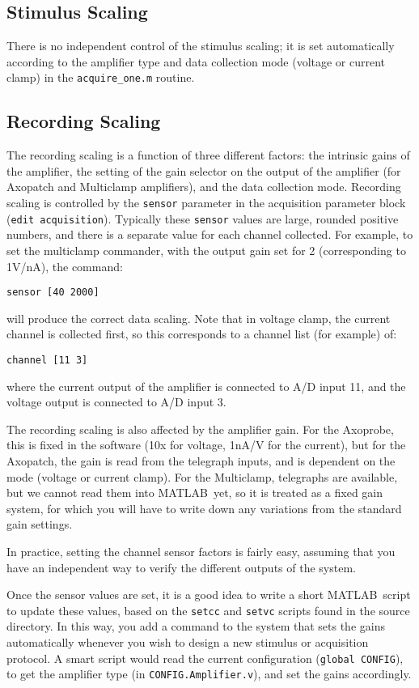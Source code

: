 \documentclass[11pt, letterpaper, titlepage]{paper}
\newcommand{\ml}{\textsf{MATLAB}}
\begin{document}
\subsection{Stimulus Scaling}
There is no independent control of the stimulus scaling; it is set 
automatically according to the amplifier type and data collection 
mode (voltage or current clamp) in the \texttt{acquire\_one.m} 
routine.

\subsection{Recording Scaling}
The recording scaling is a function of three different factors: 
the intrinsic gains of the amplifier, the setting of the gain 
selector on the output of the amplifier (for Axopatch and 
Multiclamp amplifiers), and the data collection mode. Recording 
scaling is controlled by the \texttt{sensor} parameter in the 
acquisition parameter block (\texttt{edit acquisition}). Typically 
these \texttt{sensor} values are large, rounded positive numbers, 
and there is a separate value for each channel collected. For 
example, to set the multiclamp commander, with the output gain set 
for 2 (corresponding to 1V/nA), the command:

\verb"sensor [40 2000]"

will produce the correct data scaling. Note that in voltage clamp, 
the current channel is collected first, so this corresponds to a 
channel list (for example) of:

\verb"channel [11 3]"

where the current output of the amplifier is connected to A/D 
input 11, and the voltage output is connected to A/D input 3.

The recording scaling is also affected by the amplifier gain. For 
the Axoprobe, this is fixed in the software (10x for voltage, 
1nA/V for the current), but for the Axopatch, the gain is read 
from the telegraph inputs, and is dependent on the mode (voltage 
or current clamp). For the Multiclamp, telegraphs are available, 
but we cannot read them into \ml\ yet, so it is treated as a fixed 
gain system, for which you will have to write down any variations 
from the standard gain settings.

In practice, setting the channel sensor factors is fairly easy, 
assuming that you have an independent way to verify the different 
outputs of the system.

Once the sensor values are set, it is a good idea to write a short 
\ml\ script to update these values, based on the \texttt{setcc} 
and \texttt{setvc} scripts found in the source directory. In this 
way, you add a command to the system that sets the gains 
automatically whenever you wish to design a new stimulus or 
acquisition protocol. A smart script would read the current 
configuration (\texttt{global CONFIG}), to get the amplifier type 
(in \texttt{CONFIG.Amplifier.v}), and set the gains accordingly.
\end{document}

